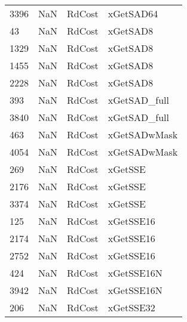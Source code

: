 \begin{tabular}{llll}
3396 &                   NaN &                     RdCost &                                 xGetSAD64 \\
43   &                   NaN &                     RdCost &                                  xGetSAD8 \\
1329 &                   NaN &                     RdCost &                                  xGetSAD8 \\
1455 &                   NaN &                     RdCost &                                  xGetSAD8 \\
2228 &                   NaN &                     RdCost &                                  xGetSAD8 \\
393  &                   NaN &                     RdCost &                              xGetSAD\_full \\
3840 &                   NaN &                     RdCost &                              xGetSAD\_full \\
463  &                   NaN &                     RdCost &                              xGetSADwMask \\
4054 &                   NaN &                     RdCost &                              xGetSADwMask \\
269  &                   NaN &                     RdCost &                                   xGetSSE \\
2176 &                   NaN &                     RdCost &                                   xGetSSE \\
3374 &                   NaN &                     RdCost &                                   xGetSSE \\
125  &                   NaN &                     RdCost &                                 xGetSSE16 \\
2174 &                   NaN &                     RdCost &                                 xGetSSE16 \\
2752 &                   NaN &                     RdCost &                                 xGetSSE16 \\
424  &                   NaN &                     RdCost &                                xGetSSE16N \\
3942 &                   NaN &                     RdCost &                                xGetSSE16N \\
206  &                   NaN &                     RdCost &                                 xGetSSE32 \\

\end{tabular}
